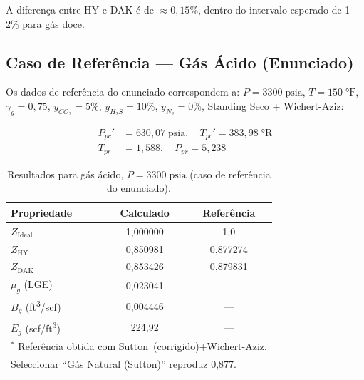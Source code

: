 \documentclass[12pt,a4paper]{article}
\begin{document}
\noindent A diferença entre HY e DAK é de $\approx 0{,}15\%$, dentro do
intervalo esperado de 1--2\% para gás doce.

\subsection{Caso de Referência — Gás Ácido (Enunciado)}

Os dados de referência do enunciado correspondem a:
$P=3300\;\text{psia}$, $T=150\;°\text{F}$, $\gamma_g=0{,}75$,
$y_{CO_2}=5\%$, $y_{H_2S}=10\%$, $y_{N_2}=0\%$,
Standing Seco + Wichert-Aziz:

\begin{align*}
  P_{pc}' &= 630{,}07\;\text{psia}, \quad T_{pc}' = 383{,}98\;°\text{R}\\
  T_{pr} &= 1{,}588, \quad P_{pr} = 5{,}238
\end{align*}

\begin{table}[H]
\centering
\caption{Resultados para gás ácido, $P=3300\;\text{psia}$ (caso de referência
         do enunciado).}
\begin{tabular}{lcc}
\toprule
Propriedade & Calculado & Referência \\
\midrule
$Z_{\text{Ideal}}$ & 1{,}000000 & 1{,}0 \\
$Z_{\text{HY}}$    & 0{,}850981 & 0{,}877274\rlap{$^*$} \\
$Z_{\text{DAK}}$   & 0{,}853426 & 0{,}879831\rlap{$^*$} \\
$\mu_g$ (LGE)      & 0{,}023041 & --- \\
$B_g$ (ft\textsuperscript{3}/scf) & 0{,}004446 & --- \\
$E_g$ (scf/ft\textsuperscript{3}) & 224{,}92  & --- \\
\bottomrule
\multicolumn{3}{l}{\small $^*$ Referência obtida com Sutton~(corrigido)+Wichert-Aziz.}\\
\multicolumn{3}{l}{\small \quad Seleccionar ``Gás Natural (Sutton)'' reproduz 0{,}877.}
\end{tabular}
\label{tab:val_acido}
\end{table}
\end{document}
